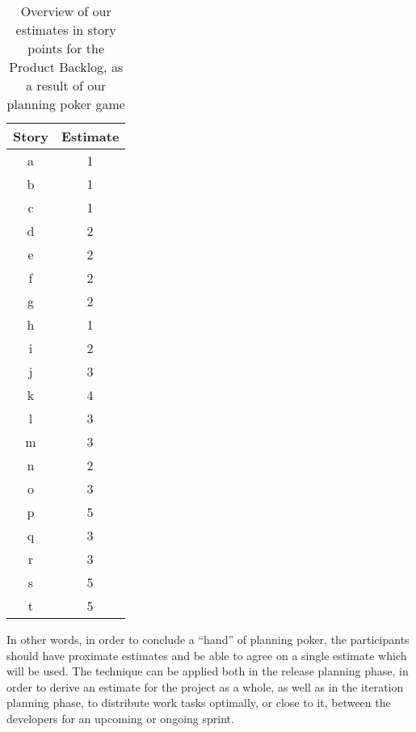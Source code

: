 \begin{wraptable}{r}{3.3cm}
\begin{tabular}{@{}cc@{}}
\toprule
\textbf{Story} & \textbf{Estimate} \\ \midrule
a              & 1                 \\ \midrule
b              & 1                 \\ \midrule
c              & 1                 \\ \midrule
d              & 2                 \\ \midrule
e              & 2                 \\ \midrule
f              & 2                 \\ \midrule
g              & 2                 \\ \midrule
h              & 1                 \\ \midrule
i              & 2                 \\ \midrule
j              & 3                 \\ \midrule
k              & 4                 \\ \midrule
l              & 3                 \\ \midrule
m              & 3                 \\ \midrule
n              & 2                 \\ \midrule
o              & 3                 \\ \midrule
p              & 5                 \\ \midrule
q              & 3                 \\ \midrule
r              & 3                 \\ \midrule
s              & 5                 \\ \midrule
t              & 5                 \\ \bottomrule
\end{tabular}
\caption{Overview of our estimates in story points for the Product Backlog, as a result of our planning poker game}
\label{table_estimates}
\end{wraptable}In other words, in order to conclude a “hand” of planning poker, the participants should have proximate estimates and be able to agree on a single estimate which will be used. The technique can be applied both in the release planning phase, in order to derive an estimate for the project as a whole, as well as in the iteration planning phase, to distribute work tasks optimally, or close to it, between the developers for an upcoming or ongoing sprint.

